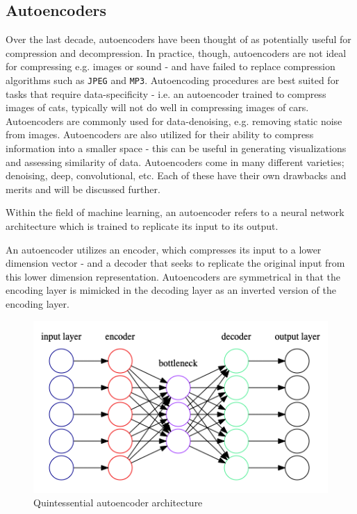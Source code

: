 \subsection{Autoencoders} \label{sec:Autoencoders}
Over the last decade, autoencoders have been thought of as potentially useful for compression and decompression. 
In practice, though, autoencoders are not ideal for compressing e.g. images or sound - and have failed to replace compression algorithms such as \texttt{JPEG} and \texttt{MP3}.
Autoencoding procedures are best suited for tasks that require data-specificity - i.e. an autoencoder trained to compress images of cats, typically will not do well in compressing images of cars. 
\newline
Autoencoders are commonly used for data-denoising, e.g. removing static noise from images. 
Autoencoders are also utilized for their ability to compress information into a smaller space - this can be useful in generating visualizations and assessing similarity of data. 
\newline
Autoencoders come in many different varieties; denoising, deep, convolutional, etc. Each of these have their own drawbacks and merits and will be discussed further.

Within the field of machine learning, an autoencoder refers to a neural network architecture which is trained to replicate its input to its output\autocite{Bengio2009}.

An autoencoder utilizes an encoder, which compresses its input to a lower dimension vector - and a decoder that seeks to replicate the original input from this lower dimension representation.
Autoencoders are symmetrical in that the encoding layer is mimicked in the decoding layer as an inverted version of the encoding layer.

\begin{figure}[H]
    \centering
    \includegraphics[scale=0.4]{pictures/graphviz/autoencoder_simple}
    \caption{Quintessential autoencoder architecture}
    \label{fig:simpleautoencoder}
\end{figure}

